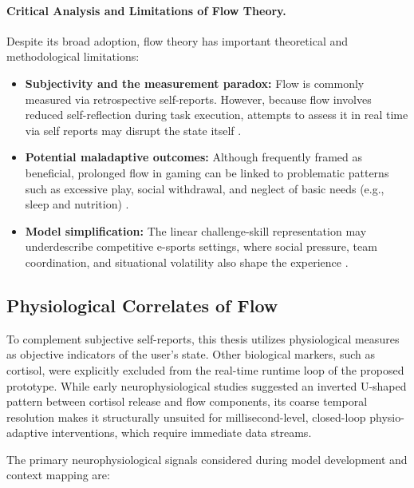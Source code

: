 \paragraph{Critical Analysis and Limitations of Flow Theory.}
Despite its broad adoption, flow theory has important theoretical and methodological limitations:
\begin{itemize}
    \item \textbf{Subjectivity and the measurement paradox:} Flow is commonly measured via retrospective self-reports. However, because flow involves reduced self-reflection during task execution, attempts to assess it in real time via self reports may disrupt the state itself \autocite{9296229}.
    \item \textbf{Potential maladaptive outcomes:} Although frequently framed as beneficial, prolonged flow in gaming can be linked to problematic patterns such as excessive play, social withdrawal, and neglect of basic needs (e.g., sleep and nutrition) \autocite{harris2023systematic}.
\item \textbf{Model simplification:} The linear challenge-skill representation may underdescribe competitive e-sports settings, where social pressure, team coordination, and situational volatility also shape the experience \autocite{poulus2021determinants}.\end{itemize}

\subsection{Physiological Correlates of Flow}
To complement subjective self-reports, this thesis utilizes physiological measures as objective indicators of the user's state. Other biological markers, such as cortisol, were explicitly excluded from the real-time runtime loop of the proposed prototype. While early neurophysiological studies suggested an inverted U-shaped pattern between cortisol release and flow components, its coarse temporal resolution makes it structurally unsuited for millisecond-level, closed-loop physio-adaptive interventions, which require immediate data streams.

The primary neurophysiological signals considered during model development and context mapping are:

